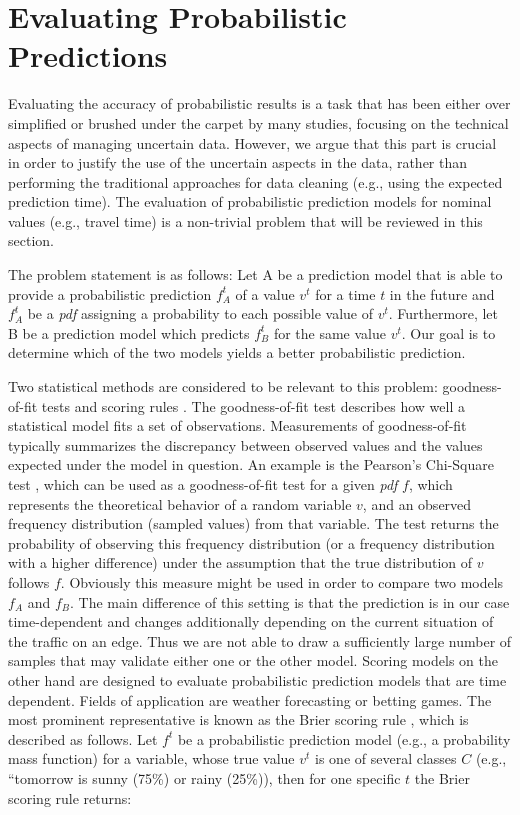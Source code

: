 \section{Evaluating Probabilistic Predictions}
\vspace{0.2cm}
\label{sec:evaluate}
Evaluating the accuracy of probabilistic results is a task that has been either
over simplified or brushed under the carpet by many studies, focusing on the
technical aspects of managing uncertain data. However, we argue that this part
is crucial in order to justify the use of the uncertain aspects in the data,
rather than performing the traditional approaches for data cleaning (e.g., using the expected prediction
time). The evaluation of probabilistic prediction models for nominal values
(e.g., travel time) is a non-trivial problem that will be reviewed in this
section.

The problem statement is as follows: Let A be a prediction model that is able
to provide a probabilistic prediction $f_A^t$ of a value $v^t$ for a
time $t$ in the future and $f_A^t$ be a \textit{pdf} assigning a probability to
each possible value of $v^t$. Furthermore, let B be a prediction model which predicts
$f_B^t$ for the same value $v^t$. Our goal is to determine which of the two
models yields a better probabilistic prediction.

Two statistical methods are considered to be relevant to this problem:
goodness-of-fit tests \cite{Tay97} and scoring rules \cite{Bic07}. The
goodness-of-fit test describes how well a statistical model fits a set of
observations.
Measurements of goodness-of-fit typically summarizes the discrepancy between
observed values and the values expected under the model in question. An example is the
Pearson's Chi-Square test \cite{Pea00}, which can be used as a goodness-of-fit
test for a given \textit{pdf} $f$, which represents the theoretical behavior of
a random variable $v$, and an observed frequency distribution (sampled values)
from that variable. The test returns the probability of observing this frequency
distribution (or a frequency distribution with a higher difference) under the
assumption that the true distribution of $v$ follows $f$. Obviously this measure
might be used in order to compare two models $f_A$ and $f_B$. The main
difference of this setting is that the prediction is in our case time-dependent
and changes additionally depending on the current situation of the traffic on
an edge. Thus we are not able to draw a sufficiently large number of samples
that may validate either one or the other model.
Scoring models on the other hand are designed to evaluate probabilistic
prediction models that are time dependent. Fields of application are weather
forecasting or betting games. The most prominent representative is known as the
Brier scoring rule \cite{Bri50}, which is described as follows. Let $f^t$ be a
probabilistic prediction model (e.g., a probability mass function) for a
variable, whose true value $v^t$ is one of several classes $C$ (e.g., ``tomorrow
is sunny (75\%) or rainy (25\%)), then for one specific $t$ the Brier scoring
rule returns:

